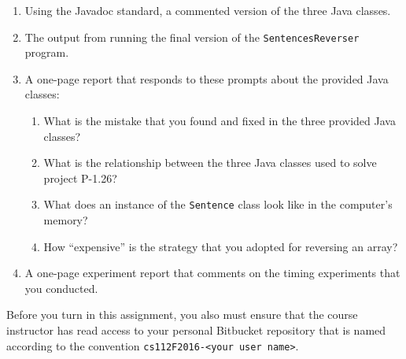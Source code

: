 \vspace*{-.05in}
\begin{enumerate}

  \itemsep 0em
  \item Using the Javadoc standard, a commented version of the three Java classes.

  \item The output from running the final version of the {\tt SentencesReverser} program.

  \item A one-page report that responds to these prompts about the provided Java classes:

    \vspace*{-.05in}
    \begin{enumerate}
      \itemsep 0em

      \item What is the mistake that you found and fixed in the three provided Java classes?

      \item What is the relationship between the three Java classes used to solve project P-1.26?

      \item What does an instance of the {\tt Sentence} class look like in the computer's memory?

      \item How ``expensive'' is the strategy that you adopted for reversing an array?

    \end{enumerate}

  \item A one-page experiment report that comments on the timing experiments that you conducted.

\end{enumerate}

\vspace*{-.05in}

Before you turn in this assignment, you also must ensure that the course instructor has read access to your personal
Bitbucket repository that is named according to the convention {\tt cs112F2016-<your user name>}.


